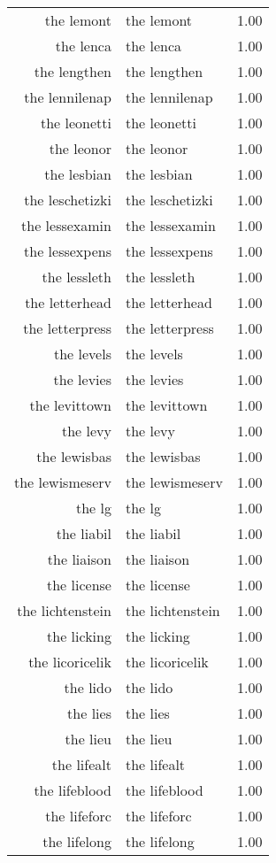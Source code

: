 \begin{table}[ht]
\begin{tabular}{rlr}
  the lemont & the lemont & 1.00 \\ 
  the lenca & the lenca & 1.00 \\ 
  the lengthen & the lengthen & 1.00 \\ 
  the lennilenap & the lennilenap & 1.00 \\ 
  the leonetti & the leonetti & 1.00 \\ 
  the leonor & the leonor & 1.00 \\ 
  the lesbian & the lesbian & 1.00 \\ 
  the leschetizki & the leschetizki & 1.00 \\ 
  the lessexamin & the lessexamin & 1.00 \\ 
  the lessexpens & the lessexpens & 1.00 \\ 
  the lessleth & the lessleth & 1.00 \\ 
  the letterhead & the letterhead & 1.00 \\ 
  the letterpress & the letterpress & 1.00 \\ 
  the levels & the levels & 1.00 \\ 
  the levies & the levies & 1.00 \\ 
  the levittown & the levittown & 1.00 \\ 
  the levy & the levy & 1.00 \\ 
  the lewisbas & the lewisbas & 1.00 \\ 
  the lewismeserv & the lewismeserv & 1.00 \\ 
  the lg & the lg & 1.00 \\ 
  the liabil & the liabil & 1.00 \\ 
  the liaison & the liaison & 1.00 \\ 
  the license & the license & 1.00 \\ 
  the lichtenstein & the lichtenstein & 1.00 \\ 
  the licking & the licking & 1.00 \\ 
  the licoricelik & the licoricelik & 1.00 \\ 
  the lido & the lido & 1.00 \\ 
  the lies & the lies & 1.00 \\ 
  the lieu & the lieu & 1.00 \\ 
  the lifealt & the lifealt & 1.00 \\ 
  the lifeblood & the lifeblood & 1.00 \\ 
  the lifeforc & the lifeforc & 1.00 \\ 
  the lifelong & the lifelong & 1.00 \\ 

\end{tabular}
\end{table}
